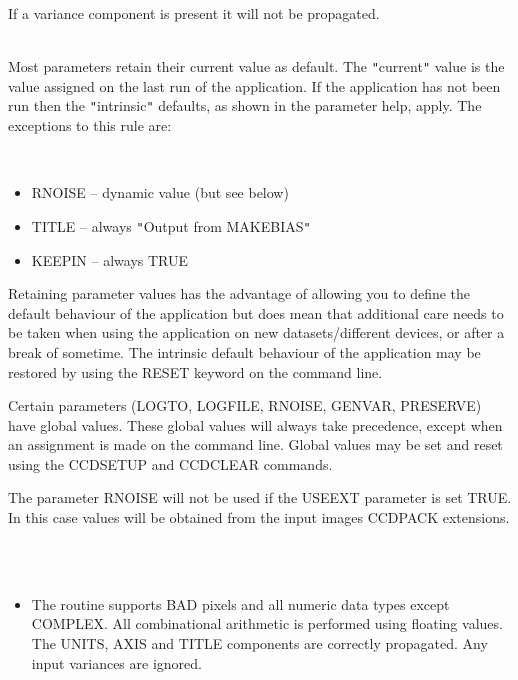 \documentclass[twoside,11pt]{article}
\newcommand{\htmlref}[2]{#1}
\renewcommand{\_}{\texttt{\symbol{95}}}
\newcommand{\qt}[1]{{\tt "}#1{\tt "}}
\newcommand{\xroutine}[1]{\htmlref{{\sc #1}}{#1}}
\newcommand{\sstdiytopic}[2]{\item[#1:] \mbox{} \\[1.3ex] #2}
\newcommand{\sstimplementationstatus}[1]{
   \item[{Implementation Status:}] \mbox{} \\[1.3ex] #1}
\newcommand{\sstitemlist}[1]{
  \mbox{} \\
  \vspace{-3.5ex}
  \begin{itemize}
     #1
  \end{itemize}
}
\newcommand{\sstitem}{\item}
\newcommand{\sstdiytopic}[2]{\item[{#1}] #2 }
\newcommand{\sstimplementationstatus}[1]{
      \item[Implementation Status:] #1
   }
\newcommand{\sstitemlist}[1]{
      \begin{itemize}
         #1
      \end{itemize}
      \\
   }
\newcommand{\sstitem}{\item}
\begin{document}
{{{         \sstitem
         If a variance component is present it will not be propagated.
      }
   }
   \sstdiytopic{
      Behaviour of parameters
   } {
      Most parameters retain their current value as default. The
      \qt{current} value is the value assigned on the last run of the
      application. If the application has not been run then the
      \qt{intrinsic} defaults, as shown in the parameter help, apply.
      The exceptions to this rule are:
      \sstitemlist{

         \sstitem
            RNOISE  -- dynamic value (but see below)

         \sstitem
            TITLE   -- always \qt{Output from MAKEBIAS}

         \sstitem
            KEEPIN  -- always TRUE

      }
      Retaining parameter values has the advantage of allowing you to
      define the default behaviour of the application but does mean
      that additional care needs to be taken when using the application
      on new datasets/different devices, or after a break of sometime.
      The intrinsic default behaviour of the application may be
      restored by using the RESET keyword on the command line.

      Certain parameters (LOGTO, LOGFILE, RNOISE, GENVAR, PRESERVE)
      have global values. These global values will always take
      precedence, except when an assignment is made on the command line.
      Global values may be set and reset using the \xroutine{CCDSETUP} and
      \xroutine{CCDCLEAR} commands.

      The parameter RNOISE will not be used if the USEEXT parameter is
      set TRUE. In this case values will be obtained from the input images
      CCDPACK extensions.
   }
\newpage
   \sstimplementationstatus{
      \sstitemlist{

         \sstitem
         The routine supports BAD pixels and all numeric data types
           except COMPLEX.  All combinational arithmetic is performed using
           floating values.  The UNITS, AXIS and TITLE components
           are correctly propagated. Any input variances are ignored.
      }
   }
}
\end{document}
